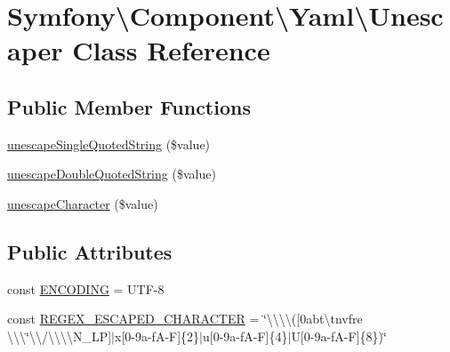 \hypertarget{classSymfony_1_1Component_1_1Yaml_1_1Unescaper}{}\section{Symfony\textbackslash{}Component\textbackslash{}Yaml\textbackslash{}Unescaper Class Reference}
\label{classSymfony_1_1Component_1_1Yaml_1_1Unescaper}
\subsection*{Public Member Functions}
\begin{DoxyCompactItemize}
\item 
\hyperlink{classSymfony_1_1Component_1_1Yaml_1_1Unescaper_a8fb4ebd96ef685c8f7ee984180dfaad4}{unescape\+Single\+Quoted\+String} (\$value)
\item 
\hyperlink{classSymfony_1_1Component_1_1Yaml_1_1Unescaper_aac9bde427279583d9c622191fdb1920b}{unescape\+Double\+Quoted\+String} (\$value)
\item 
\hyperlink{classSymfony_1_1Component_1_1Yaml_1_1Unescaper_a6c7e44b0e009cea76e0e590af22c83b9}{unescape\+Character} (\$value)
\end{DoxyCompactItemize}
\subsection*{Public Attributes}
\begin{DoxyCompactItemize}
\item 
const \hyperlink{classSymfony_1_1Component_1_1Yaml_1_1Unescaper_acf22c4bb358a547676976c505ac8a40d}{E\+N\+C\+O\+D\+I\+NG} = \textquotesingle{}U\+TF-\/8\textquotesingle{}
\item 
const \hyperlink{classSymfony_1_1Component_1_1Yaml_1_1Unescaper_a7ac46527215d1d9abb99d5d046ada1ef}{R\+E\+G\+E\+X\+\_\+\+E\+S\+C\+A\+P\+E\+D\+\_\+\+C\+H\+A\+R\+A\+C\+T\+ER} = \char`\"{}\textbackslash{}\textbackslash{}\textbackslash{}\textbackslash{}(\mbox{[}0abt\textbackslash{}tnvfre \textbackslash{}\textbackslash{}\textbackslash{}\char`\"{}\textbackslash{}\textbackslash{}/\textbackslash{}\textbackslash{}\textbackslash{}\textbackslash{}\+N\+\_\+\+L\+P\mbox{]}$\vert$x\mbox{[}0-\/9a-\/f\+A-\/\+F\mbox{]}\{2\}$\vert$u\mbox{[}0-\/9a-\/f\+A-\/\+F\mbox{]}\{4\}$\vert$\+U\mbox{[}0-\/9a-\/f\+A-\/\+F\mbox{]}\{8\})\char`\"{}
\end{DoxyCompactItemize}


